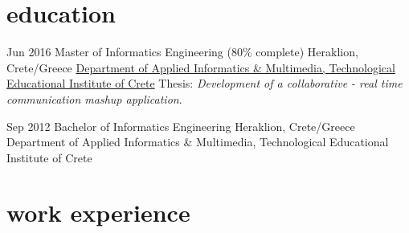 \vspace{-0.3cm}
\section{\normalfont education}
\vspace{-0.1cm}
\begin{entrylist}
\entry
{Jun 2016}
{Master {\normalfont of Informatics Engineering}}
{(80\% complete) Heraklion, Crete/Greece}
{\href{https://www.teicrete.gr/}{Department of Applied Informatics \& Multimedia, Technological Educational Institute of Crete}}
Thesis: \emph{Development of a collaborative - real time communication mashup application}.\\
\vspace{-.4cm}

\entry
{Sep 2012}
{Bachelor {\normalfont of Informatics Engineering}}
{Heraklion, Crete/Greece}
Department of Applied Informatics \& Multimedia, Technological Educational Institute of Crete
\end{entrylist}

\vspace{-.3cm}
\section{\normalfont work experience}

